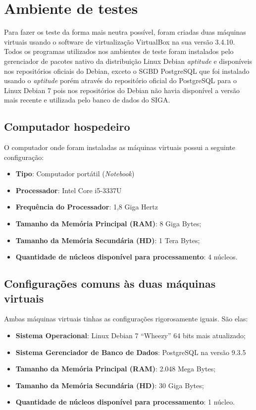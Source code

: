 \section{Ambiente de testes}

Para fazer os teste da forma mais neutra possível, foram criadas duas máquinas virtuais usando o software de virtualização VirtualBox na sua versão 3.4.10.\\
Todos os programas utilizados nos ambientes de teste foram instalados pelo gerenciador de pacotes nativo da distribuição Linux Debian \textit{aptitude} e disponíveis nos repositórios oficiais do Debian, exceto o SGBD PostgreSQL que foi instalado usando o \textit{aptitude} porém através do repositório oficial do PostgreSQL para o Linux Debian 7 pois nos repositórios do Debian não havia disponível a versão mais recente e utilizada pelo banco de dados do SIGA.

\subsection{Computador hospedeiro}
O computador onde foram instaladas as máquinas virtuais possui a seguinte 
configuração:
\begin{itemize}
	\item \textbf{Tipo}: Computador portátil (\textit{Notebook})
	\item \textbf{Processador}: Intel Core i5-3337U
	\item \textbf{Frequência do Processador}: 1,8 Giga Hertz
	\item \textbf{Tamanho da Memória Principal (RAM)}: 8 Giga Bytes;
	\item \textbf{Tamanho da Memória Secundária (HD)}: 1 Tera Bytes;
	\item \textbf{Quantidade de núcleos disponível para processamento}: 4 
	núcleos.
\end{itemize}

\subsection{Configurações comuns às duas máquinas virtuais}
 Ambas máquinas virtuais tinhas as configurações rigorosamente iguais. São elas:
\begin{itemize}
\item \textbf{Sistema Operacional}: Linux Debian 7 “Wheezy” 64 bits mais atualizado;
\item \textbf{Sistema Gerenciador de Banco de Dados}: PostgreSQL na versão 9.3.5
\item \textbf{Tamanho da Memória Principal (RAM)}: 2.048 Mega Bytes;
\item \textbf{Tamanho da Memória Secundária (HD)}: 30 Giga Bytes;
\item \textbf{Quantidade de núcleos disponível para processamento}: 1 núcleo.
\end{itemize}

